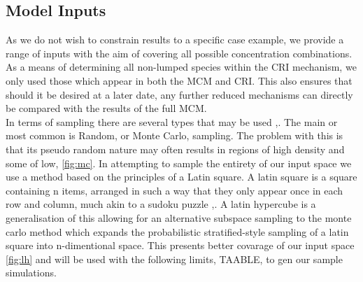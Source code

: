 \documentclass{pasa}%
\begin{document}
\subsection{Model Inputs}
As we do not wish to constrain results to a specific case example, we provide a range of inputs with the aim of covering all possible concentration combinations. As a means of determining all non-lumped species within the CRI mechanism, we only used those which appear in both the MCM and CRI. This also ensures that should it be desired at a later date, any further reduced mechanisms can directly be compared with the results of the full MCM. \\

In terms of sampling there are several types that may be used ,\cite{sampling}. The main or most common is Random, or Monte Carlo, sampling. The problem with this is that its pseudo random nature may often results in regions of high density and some of low, \autoref{fig:mc}. In attempting to sample the entirety of our input space we use a method based on the principles of a Latin square. A latin square is a square containing n items, arranged in such a way that they only appear once in each row and column, much akin to a sudoku puzzle ,\cite{lsq}. A latin hypercube is a generalisation of this allowing for an alternative subspace sampling to the monte carlo method which expands the probabilistic stratified-style sampling of a latin square into n-dimentional space. This presents better covarage of our input space \autoref{fig:lh}  and will be used with the following limits, TAABLE, to gen our sample simulations.
\end{document}

